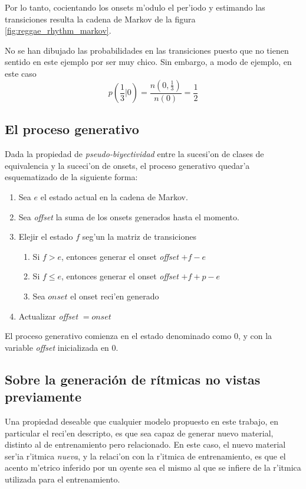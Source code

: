 Por lo tanto, cocientando los onsets m'odulo el per'iodo y estimando las transiciones resulta la cadena de Markov de la figura \ref{fig:reggae_rhythm_markov}.
\begin{imagen}
\end{imagen}

No se han dibujado las probabilidades en las transiciones puesto que no tienen sentido en este ejemplo por ser muy chico. Sin embargo, a modo de ejemplo, en este caso
$$p(\frac{1}{3}|0) = \frac{n(0, \frac{1}{3})}{n(0)} = \frac{1}{2}$$

\subsection{El proceso generativo}
Dada la propiedad de \emph{pseudo-biyectividad} entre la sucesi'on de clases de equivalencia y la suceci'on de onsets, el proceso generativo quedar'a esquematizado de la siguiente 
forma:

\begin{enumerate}
  \item Sea $e$ el estado actual en la cadena de Markov. 
  \item Sea \emph{offset} la suma de los onsets generados hasta el momento. 
  \item Elejir el estado $f$ seg'un la matriz de transiciones
  \begin{enumerate}
    \item Si $f > e$, entonces generar el onset \emph{offset} $+ f-e$
    \item Si $f \leq e$, entonces generar el onset \emph{offset} $+ f + p - e$
    \item Sea $onset$ el onset reci'en generado
  \end{enumerate}
  \item Actualizar \emph{offset} $= onset$
\end{enumerate}

El proceso generativo comienza en el estado denominado como $0$, y con la variable \emph{offset} inicializada en $0$.

\subsection{Sobre la generaci\'on de r\'itmicas no vistas previamente}
Una propiedad deseable que cualquier modelo propuesto en este trabajo, en particular el reci'en descripto, es que sea capaz de generar nuevo material, distinto al de entrenamiento
pero relacionado. En este caso, el nuevo material ser'ia r'itmica \emph{nueva}, y la relaci'on con la r'itmica de entrenamiento, es que el acento m'etrico inferido por un oyente 
sea el mismo al que se infiere de la r'itmica utilizada para el entrenamiento. 

